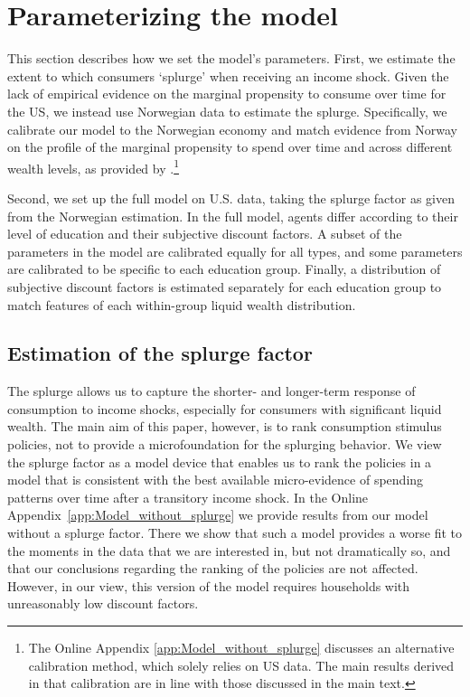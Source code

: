 \documentclass[\econtexRoot/HAFiscal]{subfiles}
\begin{document}
\hypertarget{parameterizing-the-model}{}\par\section{Parameterizing the model}
\notinsubfile{\label{sec:parameters}}

This section describes how we set the model's parameters. First, we estimate the extent to which consumers `splurge' when receiving an income shock. Given the lack of empirical evidence on the marginal propensity to consume over time for the US, we instead use Norwegian data to estimate the splurge. Specifically, we calibrate our model to the Norwegian economy and match evidence from Norway on the profile of the marginal propensity to spend over time and across different wealth levels, as provided by \citet{fagereng_mpc_2021}.\footnote{The Online Appendix \ref{app:Model_without_splurge} discusses an alternative calibration method, which solely relies on US data. The main results derived in that calibration are in line with those discussed in the main text.}

Second, we set up the full model on U.S. data, taking the splurge factor as given from the Norwegian estimation. In the full model, agents differ according to their level of education and their subjective discount factors. A subset of the parameters in the model are calibrated equally for all types, and some parameters are calibrated to be specific to each education group. Finally, a distribution of subjective discount factors is estimated separately for each education group to match features of each within-group liquid wealth distribution.


\hypertarget{estimation-of-the-splurge-factor}{}\par\subsection{Estimation of the splurge factor}
\notinsubfile{\label{sec:splurge}}

The splurge allows us to capture the shorter- and longer-term response of consumption to income shocks, especially for consumers with significant liquid wealth. The main aim of this paper, however, is to rank consumption stimulus policies, not to provide a microfoundation for the splurging behavior. We view the splurge factor as a model device that enables us to rank the policies in a model that is consistent with the best available micro-evidence of spending patterns over time after a transitory income shock. In the Online  Appendix~\ref{app:Model_without_splurge} we provide results from our model without a splurge factor. There we show that such a model provides a worse fit to the moments in the data that we are interested in, but not dramatically so, and that our conclusions regarding the ranking of the policies are not affected. However, in our view, this version of the model requires households with unreasonably low discount factors.
\end{document}
